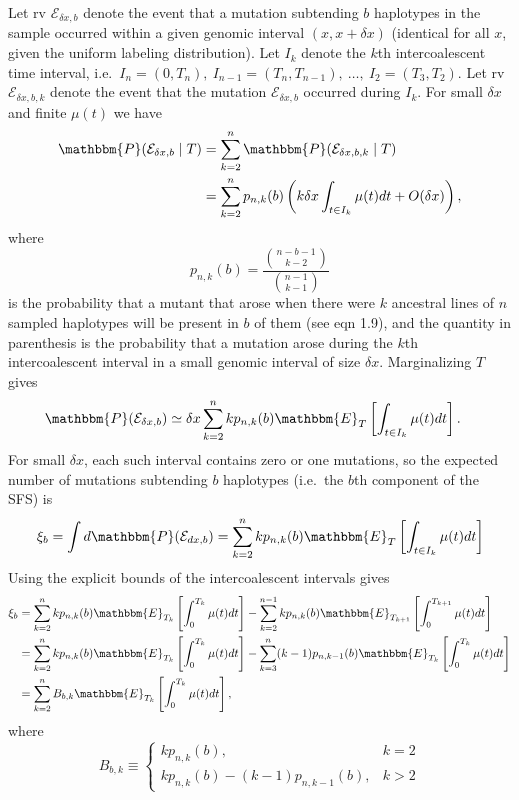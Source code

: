 \documentclass[11pt]{article}
\begin{document}
Let rv $\mathcal{E}_{\delta x, b}$ denote the event that a mutation subtending $b$ haplotypes in the sample occurred within a given genomic interval $(x,x+\delta x)$ (identical for all $x$, given the uniform labeling distribution).
Let $I_k$ denote the $k$th intercoalescent time interval, i.e.\ $I_n = (0, T_n),\ I_{n-1} = (T_n, T_{n-1}),\ \dots,\ I_2 = (T_3, T_2)$.
Let rv $\mathcal{E}_{\delta x, b, k}$ denote the event that the mutation $\mathcal{E}_{\delta x, b}$ occurred during $I_k$.
For small $\delta x$ and finite $\mu(t)$ we have
\begin{align*}
\mathbbm{P}(\mathcal{E}_{\delta x, b}\mid T) &= \sum_{k=2}^n \mathbbm{P}(\mathcal{E}_{\delta x, b, k}\mid T)\\
&= \sum_{k=2}^n p_{n,k}(b)\left(k\delta x\int_{t\in I_k}\mu(t)dt + O(\delta x)\right),
\end{align*}
where
\begin{equation}
\label{eqn:p}
p_{n,k}(b) = \frac{\binom{n-b-1}{k-2}}{\binom{n-1}{k-1}}
\end{equation}
is the probability that a mutant that arose when there were $k$ ancestral lines of $n$ sampled haplotypes will be present in $b$ of them (see \cite{Griffiths1998-qf} eqn 1.9), and the quantity in parenthesis is the probability that a mutation arose during the $k$th intercoalescent interval in a small genomic interval of size $\delta x$.
Marginalizing $T$ gives
\begin{align*}
\mathbbm{P}(\mathcal{E}_{\delta x, b}) &\simeq \delta x\sum_{k=2}^n k p_{n,k}(b) \mathbbm{E}_T\left[\int_{t\in I_k}\mu(t)dt\right].
\end{align*}
For small $\delta x$, each such interval contains zero or one mutations, so the expected number of mutations subtending $b$ haplotypes (i.e.\ the $b$th component of the SFS) is
\[
\xi_b = \int d\mathbbm{P}(\mathcal{E}_{dx, b}) = \sum_{k=2}^n k p_{n,k}(b)\mathbbm{E}_T\left[\int_{t\in I_k}\mu(t)dt\right]\nonumber
\]
Using the explicit bounds of the intercoalescent intervals gives
\begin{align}
\label{eqn:xi}
\xi_b &= \sum_{k=2}^n k p_{n,k}(b) \mathbbm{E}_{T_k}\left[\int_0^{T_k}\mu(t)dt\right] - \sum_{k=2}^{n-1} k p_{n,k}(b) \mathbbm{E}_{T_{k+1}}\left[\int_0^{T_{k+1}}\mu(t)dt\right]\nonumber\\
&= \sum_{k=2}^n k p_{n,k}(b) \mathbbm{E}_{T_k}\left[\int_0^{T_k}\mu(t)dt\right] - \sum_{k=3}^{n} (k-1) p_{n,k-1}(b) \mathbbm{E}_{T_{k}}\left[\int_0^{T_k}\mu(t)dt\right]\nonumber\\
&= \sum_{k=2}^n B_{b,k} \mathbbm{E}_{T_k}\left[\int_0^{T_k}\mu(t)dt\right],
\end{align}
where
\begin{equation}
\label{eqn:B}
B_{b,k}\equiv
\begin{cases}
k p_{n,k}(b),& k=2\\
k p_{n,k}(b) - (k-1) p_{n,k-1}(b),& k > 2
\end{cases}
\end{equation}
\end{document}
